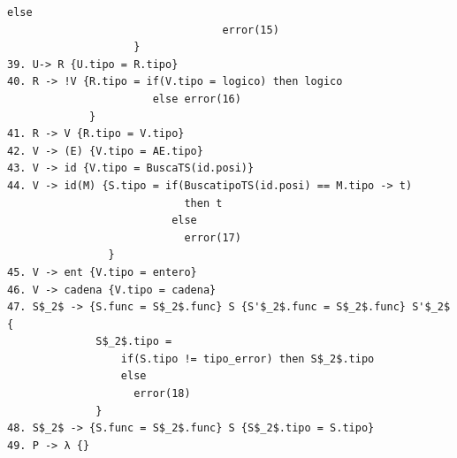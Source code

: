 \documentclass[a4paper, 12pt]{article}
\begin{document}
\begin{lstlisting}[style=EdT]
                                else
                                  error(15)
                    }
39. U-> R {U.tipo = R.tipo}
40. R -> !V {R.tipo = if(V.tipo = logico) then logico
                       else error(16)
             }
41. R -> V {R.tipo = V.tipo}
42. V -> (E) {V.tipo = AE.tipo}
43. V -> id {V.tipo = BuscaTS(id.posi)}
44. V -> id(M) {S.tipo = if(BuscatipoTS(id.posi) == M.tipo -> t)
                            then t
                          else
                            error(17)
                }
45. V -> ent {V.tipo = entero}
46. V -> cadena {V.tipo = cadena}
47. S$_2$ -> {S.func = S$_2$.func} S {S'$_2$.func = S$_2$.func} S'$_2$ {
              S$_2$.tipo =
                  if(S.tipo != tipo_error) then S$_2$.tipo
                  else
                    error(18)
              }
48. S$_2$ -> {S.func = S$_2$.func} S {S$_2$.tipo = S.tipo}
49. P -> λ {}
\end{lstlisting}
\newpage
\end{document}
